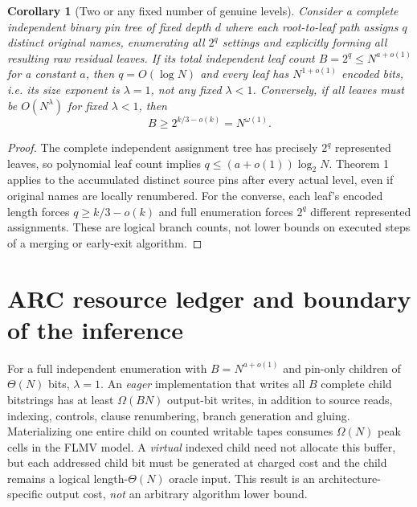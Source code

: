 \documentclass[11pt]{article}
\newtheorem{corollary}[theorem]{Corollary}
\begin{document}
\begin{corollary}[Two or any fixed number of genuine levels]
Consider a complete independent binary pin tree of fixed depth $d$ where each root-to-leaf path assigns $q$ distinct original names, enumerating all $2^q$ settings and explicitly forming all resulting raw residual leaves. If its total independent leaf count $B=2^q\le N^{a+o(1)}$ for a constant $a$, then $q=O(\log N)$ and \emph{every} leaf has $N^{1+o(1)}$ encoded bits, i.e. its size exponent is $\lambda=1$, not any fixed $\lambda<1$. Conversely, if all leaves must be $O(N^\lambda)$ for fixed $\lambda<1$, then
\[
B\ge 2^{k/3-o(k)}=N^{\omega(1)}.
\]
\end{corollary}
\begin{proof}
The complete independent assignment tree has precisely $2^q$ represented leaves, so polynomial leaf count implies $q\le(a+o(1))\log_2N$. Theorem 1 applies to the accumulated distinct source pins after every actual level, even if original names are locally renumbered. For the converse, each leaf's encoded length forces $q\ge k/3-o(k)$ and full enumeration forces $2^q$ different represented assignments. These are logical branch counts, not lower bounds on executed steps of a merging or early-exit algorithm.
\end{proof}

\section{ARC resource ledger and boundary of the inference}
For a full independent enumeration with $B=N^{a+o(1)}$ and pin-only children of $\Theta(N)$ bits, $\lambda=1$. An \emph{eager} implementation that writes all $B$ complete child bitstrings has at least $\Omega(BN)$ output-bit writes, in addition to source reads, indexing, controls, clause renumbering, branch generation and gluing. Materializing one entire child on counted writable tapes consumes $\Omega(N)$ peak cells in the FLMV model. A \emph{virtual} indexed child need not allocate this buffer, but each addressed child bit must be generated at charged cost and the child remains a logical length-$\Theta(N)$ oracle input. This result is an architecture-specific output cost, \emph{not} an arbitrary algorithm lower bound.
\end{document}
